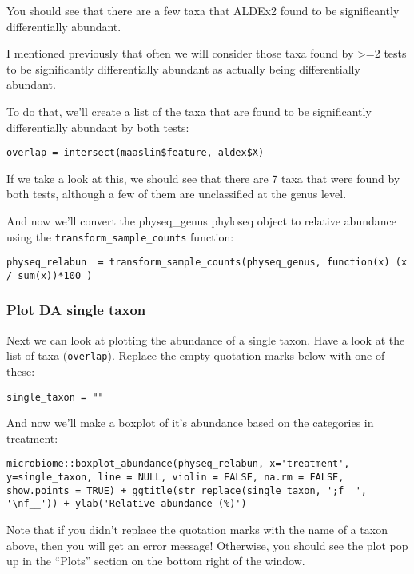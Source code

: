 \documentclass[
]{book}
\begin{document}
You should see that there are a few taxa that ALDEx2 found to be significantly differentially abundant.

I mentioned previously that often we will consider those taxa found by \textgreater=2 tests to be significantly differentially abundant as actually being differentially abundant.

To do that, we'll create a list of the taxa that are found to be significantly differentially abundant by both tests:

\begin{verbatim}
overlap = intersect(maaslin$feature, aldex$X)
\end{verbatim}

If we take a look at this, we should see that there are 7 taxa that were found by both tests, although a few of them are unclassified at the genus level.

And now we'll convert the physeq\_genus phyloseq object to relative abundance using the \texttt{transform\_sample\_counts} function:

\begin{verbatim}
physeq_relabun  = transform_sample_counts(physeq_genus, function(x) (x / sum(x))*100 )
\end{verbatim}

\subsubsection{Plot DA single taxon}\label{plot-da-single-taxon}

Next we can look at plotting the abundance of a single taxon. Have a look at the list of taxa (\texttt{overlap}). Replace the empty quotation marks below with one of these:

\begin{verbatim}
single_taxon = ""
\end{verbatim}

And now we'll make a boxplot of it's abundance based on the categories in treatment:

\begin{verbatim}
microbiome::boxplot_abundance(physeq_relabun, x='treatment', y=single_taxon, line = NULL, violin = FALSE, na.rm = FALSE, show.points = TRUE) + ggtitle(str_replace(single_taxon, ';f__', '\nf__')) + ylab('Relative abundance (%)')
\end{verbatim}

Note that if you didn't replace the quotation marks with the name of a taxon above, then you will get an error message! Otherwise, you should see the plot pop up in the ``Plots'' section on the bottom right of the window.
\end{document}
